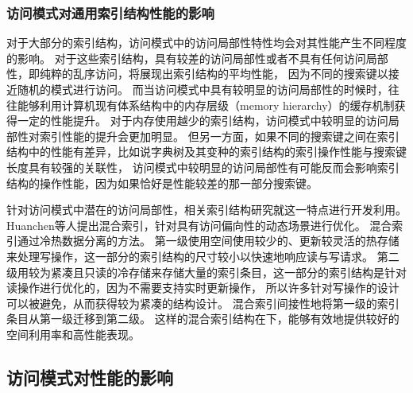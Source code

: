\subsubsection{访问模式对通用索引结构性能的影响}

对于大部分的索引结构，访问模式中的访问局部性特性均会对其性能产生不同程度的影响。
对于这些索引结构，具有较差的访问局部性或者不具有任何访问局部性，即纯粹的乱序访问，将展现出索引结构的平均性能，
因为不同的搜索键以接近随机的模式进行访问。
而当访问模式中具有较明显的访问局部性的时候时，往往能够利用计算机现有体系结构中的内存层级（memory hierarchy）的缓存机制获得一定的性能提升。
对于内存使用越少的索引结构，访问模式中较明显的访问局部性对索引性能的提升会更加明显。
但另一方面，如果不同的搜索键之间在索引结构中的性能有差异，比如说字典树及其变种的索引结构的索引操作性能与搜索键长度具有较强的关联性，
访问模式中较明显的访问局部性有可能反而会影响索引结构的操作性能，因为如果{\hotkey}恰好是性能较差的那一部分搜索键。

针对访问模式中潜在的访问局部性，相关索引结构研究就这一特点进行开发利用。
Huanchen等人提出混合索引\cite{zhang2016reducing}，针对具有访问偏向性的动态场景进行优化。
混合索引通过冷热数据分离的方法。
第一级使用空间使用较少的、更新较灵活的热存储来处理写操作，这一部分的索引结构的尺寸较小以快速地响应读与写请求。
第二级用较为紧凑且只读的冷存储来存储大量的索引条目，这一部分的索引结构是针对读操作进行优化的，因为不需要支持实时更新操作，
所以许多针对写操作的设计可以被避免，从而获得较为紧凑的结构设计。
混合索引间接性地将第一级的索引条目从第一级迁移到第二级。
这样的混合索引结构在{\skewacc}下，能够有效地提供较好的空间利用率和高性能表现。


\subsection{访问模式对{\li}性能的影响}
\label{sec:pattern-affect-li}

